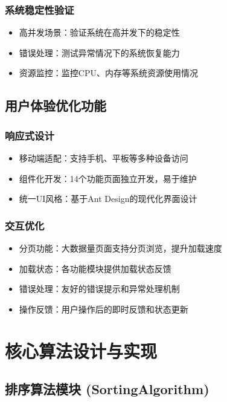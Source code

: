 \documentclass[12pt,a4paper]{article}
\begin{document}
\subsubsection{系统稳定性验证}
\begin{itemize}
    \item 高并发场景：验证系统在高并发下的稳定性
    \item 错误处理：测试异常情况下的系统恢复能力
    \item 资源监控：监控CPU、内存等系统资源使用情况
\end{itemize}

\subsection{用户体验优化功能}
\subsubsection{响应式设计}
\begin{itemize}
    \item 移动端适配：支持手机、平板等多种设备访问
    \item 组件化开发：14个功能页面独立开发，易于维护
    \item 统一UI风格：基于Ant Design的现代化界面设计
\end{itemize}

\subsubsection{交互优化}
\begin{itemize}
    \item 分页功能：大数据量页面支持分页浏览，提升加载速度
    \item 加载状态：各功能模块提供加载状态反馈
    \item 错误处理：友好的错误提示和异常处理机制
    \item 操作反馈：用户操作后的即时反馈和状态更新
\end{itemize}

\section{核心算法设计与实现}

\subsection{排序算法模块 (SortingAlgorithm)}
\end{document}
